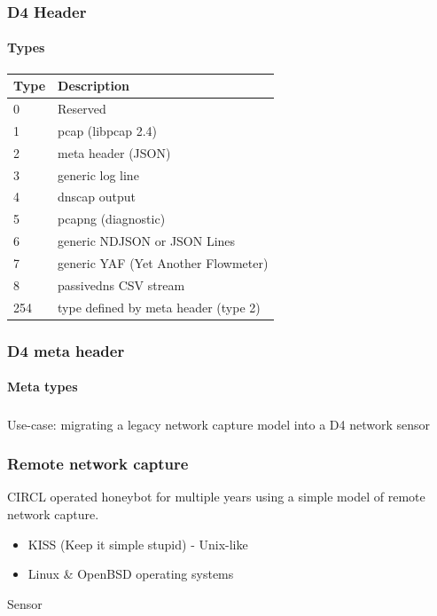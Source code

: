 \documentclass{beamer}
\begin{document}
\begin{frame}
    \frametitle{D4 Header}
    \framesubtitle{Types}
        \begin{tabular}{|l|l|}
            \hline
            Type &	Description\\
            \hline
            0 	& Reserved\\
            1 	& pcap (libpcap 2.4)\\
            2 	& meta header (JSON)\\
            3 	& generic log line\\
            4 	& dnscap output\\
            5 	& pcapng (diagnostic)\\
            6 	& generic NDJSON or JSON Lines\\
            7 	& generic YAF (Yet Another Flowmeter)\\
            8  	& passivedns CSV stream\\
            254 &	type defined by meta header (type 2)\\
            \hline
        \end{tabular}
\end{frame}

\begin{frame}
    \frametitle{D4 meta header}
    \framesubtitle{Meta types}
    \small
    
\end{frame}


\begin{frame}
        \frametitle{}
{\center Use-case: migrating a legacy network capture model into a D4 network sensor
}
\end{frame}

\begin{frame}
\frametitle{Remote network capture}
    CIRCL operated honeybot for multiple years using a simple model of remote network capture.
    \begin{definition}[Principle]
        \begin{itemize}
            \item KISS (Keep it simple stupid) - Unix-like
            \item Linux \& OpenBSD operating systems
        \end{itemize}
    \end{definition}

    \begin{block}{Sensor}
    
    \end{block}
\end{frame}
\end{document}
